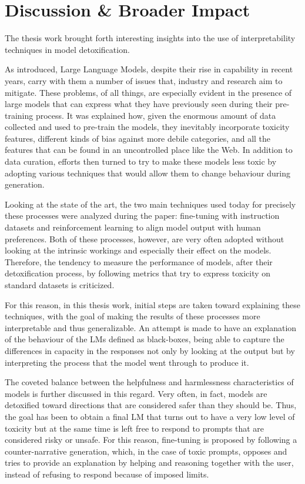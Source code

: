 
\chapter{Discussion \& Broader Impact}

The thesis work brought forth interesting insights into the use of interpretability techniques in model detoxification. 

As introduced, Large Language Models, despite their rise in capability in recent years, carry with them a number of issues that, industry and research aim to mitigate. These problems, of all things, are especially evident in the presence of large models that can express what they have previously seen during their pre-training process. It was explained how, given the enormous amount of data collected and used to pre-train the models, they inevitably incorporate toxicity features, different kinds of bias against more debile categories, and all the features that can be found in an uncontrolled place like the Web. In addition to data curation, efforts then turned to try to make these models less toxic by adopting various techniques that would allow them to change behaviour during generation.

Looking at the state of the art, the two main techniques used today for precisely these processes were analyzed during the paper: fine-tuning with instruction datasets and reinforcement learning to align model output with human preferences. Both of these processes, however, are very often adopted without looking at the intrinsic workings and especially their effect on the models. Therefore, the tendency to measure the performance of models, after their detoxification process, by following metrics that try to express toxicity on standard datasets is criticized. 

For this reason, in this thesis work, initial steps are taken toward explaining these techniques, with the goal of making the results of these processes more interpretable and thus generalizable. An attempt is made to have an explanation of the behaviour of the LMs defined as black-boxes, being able to capture the differences in capacity in the responses not only by looking at the output but by interpreting the process that the model went through to produce it. 

The coveted balance between the helpfulness and harmlessness characteristics of models is further discussed in this regard. Very often, in fact, models are detoxified toward directions that are considered safer than they should be. Thus, the goal has been to obtain a final LM that turns out to have a very low level of toxicity but at the same time is left free to respond to prompts that are considered risky or unsafe. For this reason, fine-tuning is proposed by following a counter-narrative generation, which, in the case of toxic prompts, opposes and tries to provide an explanation by helping and reasoning together with the user, instead of refusing to respond because of imposed limits. 

